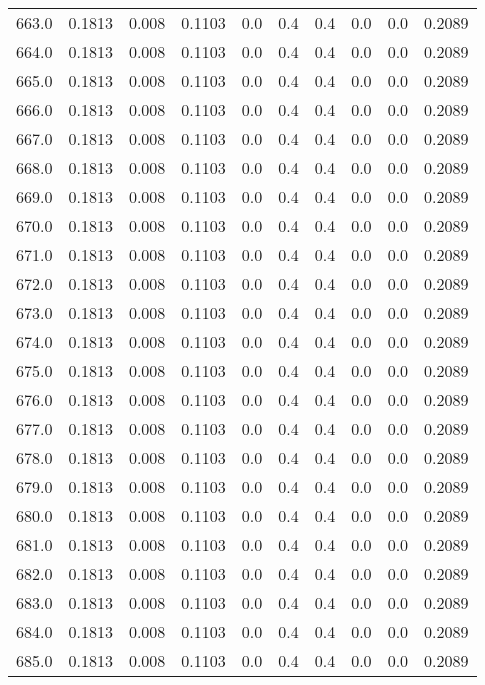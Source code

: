 \begin{longtable}{lrrrrrrrrr}
663.0 & 0.1813 & 0.008 & 0.1103 & 0.0 & 0.4 & 0.4 & 0.0 & 0.0 & 0.2089 \\
664.0 & 0.1813 & 0.008 & 0.1103 & 0.0 & 0.4 & 0.4 & 0.0 & 0.0 & 0.2089 \\
665.0 & 0.1813 & 0.008 & 0.1103 & 0.0 & 0.4 & 0.4 & 0.0 & 0.0 & 0.2089 \\
666.0 & 0.1813 & 0.008 & 0.1103 & 0.0 & 0.4 & 0.4 & 0.0 & 0.0 & 0.2089 \\
667.0 & 0.1813 & 0.008 & 0.1103 & 0.0 & 0.4 & 0.4 & 0.0 & 0.0 & 0.2089 \\
668.0 & 0.1813 & 0.008 & 0.1103 & 0.0 & 0.4 & 0.4 & 0.0 & 0.0 & 0.2089 \\
669.0 & 0.1813 & 0.008 & 0.1103 & 0.0 & 0.4 & 0.4 & 0.0 & 0.0 & 0.2089 \\
670.0 & 0.1813 & 0.008 & 0.1103 & 0.0 & 0.4 & 0.4 & 0.0 & 0.0 & 0.2089 \\
671.0 & 0.1813 & 0.008 & 0.1103 & 0.0 & 0.4 & 0.4 & 0.0 & 0.0 & 0.2089 \\
672.0 & 0.1813 & 0.008 & 0.1103 & 0.0 & 0.4 & 0.4 & 0.0 & 0.0 & 0.2089 \\
673.0 & 0.1813 & 0.008 & 0.1103 & 0.0 & 0.4 & 0.4 & 0.0 & 0.0 & 0.2089 \\
674.0 & 0.1813 & 0.008 & 0.1103 & 0.0 & 0.4 & 0.4 & 0.0 & 0.0 & 0.2089 \\
675.0 & 0.1813 & 0.008 & 0.1103 & 0.0 & 0.4 & 0.4 & 0.0 & 0.0 & 0.2089 \\
676.0 & 0.1813 & 0.008 & 0.1103 & 0.0 & 0.4 & 0.4 & 0.0 & 0.0 & 0.2089 \\
677.0 & 0.1813 & 0.008 & 0.1103 & 0.0 & 0.4 & 0.4 & 0.0 & 0.0 & 0.2089 \\
678.0 & 0.1813 & 0.008 & 0.1103 & 0.0 & 0.4 & 0.4 & 0.0 & 0.0 & 0.2089 \\
679.0 & 0.1813 & 0.008 & 0.1103 & 0.0 & 0.4 & 0.4 & 0.0 & 0.0 & 0.2089 \\
680.0 & 0.1813 & 0.008 & 0.1103 & 0.0 & 0.4 & 0.4 & 0.0 & 0.0 & 0.2089 \\
681.0 & 0.1813 & 0.008 & 0.1103 & 0.0 & 0.4 & 0.4 & 0.0 & 0.0 & 0.2089 \\
682.0 & 0.1813 & 0.008 & 0.1103 & 0.0 & 0.4 & 0.4 & 0.0 & 0.0 & 0.2089 \\
683.0 & 0.1813 & 0.008 & 0.1103 & 0.0 & 0.4 & 0.4 & 0.0 & 0.0 & 0.2089 \\
684.0 & 0.1813 & 0.008 & 0.1103 & 0.0 & 0.4 & 0.4 & 0.0 & 0.0 & 0.2089 \\
685.0 & 0.1813 & 0.008 & 0.1103 & 0.0 & 0.4 & 0.4 & 0.0 & 0.0 & 0.2089 \\

\end{longtable}
